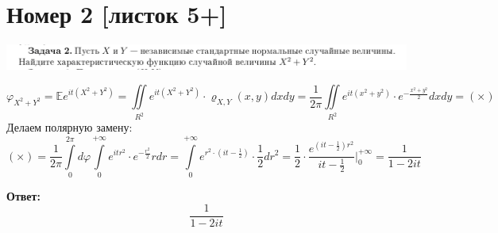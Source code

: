 \documentclass[a4paper,12pt]{article}
\begin{document}
 \section*{Номер 2 [листок 5+]}
\begin{center}
\includegraphics[scale=0.4]{2.png}
\end{center}
\[
\varphi_{X^2 + Y^2} = \mathbb{E} e^{it (X^2 + Y^2)} = \iint\limits_{R^2}  e^{it (X^2 + Y^2)} \cdot \varrho_{X, Y}(x, y) dx dy = \frac{1}{2\pi} \iint\limits_{R^2}  e^{it (x^2 + y^2)} \cdot e^{- \frac{x^2 + y^2}{2}} dx dy  = (\times)
\]
Делаем полярную замену:
\[
 (\times) = \frac{1}{2\pi} \int\limits_{0}^{2\pi} d \varphi  \int\limits_0^{+\infty} e^{itr^2} \cdot e^{-\frac{r^2}{2}} r dr = \int\limits_0^{+\infty} e^{r^2 \cdot \left(it - \frac12\right)} \cdot \frac12 dr^2 = \frac12 \cdot \frac{e^{(it - \frac12)r^2}}{it - \frac12 } \Bigg|_0^{+ \infty} = \frac{1}{1 - 2it}
\]
\begin{center}
\textbf{Ответ: } 
\[
\frac{1}{1 - 2it}
\]
\end{center}
\end{document}
